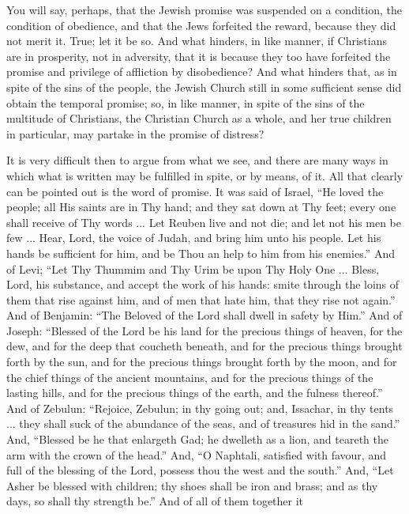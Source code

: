 You will say, perhaps, that the Jewish promise was suspended on a
condition, the condition of obedience, and that the Jews forfeited the
reward, because they did not merit it. True; let it be so. And what
hinders, in like manner, if Christians are in prosperity, not in
adversity, that it is because they too have forfeited the promise and
privilege of affliction by disobedience? And what hinders that, as in
spite of the sins of the people, the Jewish Church still in some
sufficient sense did obtain the temporal promise; so, in like manner,
in spite of the sins of the multitude of Christians, the Christian
Church as a whole, and her true children in particular, may partake in
the promise of distress?

It is very difficult then to argue from what we see, and there are
many ways in which what is written may be fulfilled in spite, or by
means, of it. All that clearly can be pointed out is the word of
promise. It was said of Israel, ``He loved the people; all His
saints are in Thy hand; and they sat down at Thy feet; every one shall
receive of Thy words ... Let Reuben live and not die; and let not his
men be few ... Hear, Lord, the voice of Judah, and bring him unto his
people. Let his hands be sufficient for him, and be Thou an help to
him from his enemies.'' And of Levi; ``Let Thy Thummim and Thy
Urim be upon Thy Holy One ... Bless, Lord, his substance, and accept
the work of his hands: smite through the loins of them that rise
against him, and of men that hate him, that they rise not again.''
And of Benjamin: ``The Beloved of the Lord shall dwell in safety
by Him.'' And of Joseph: ``Blessed of the Lord be his land for
the precious things of heaven, for the dew, and for the deep that
coucheth beneath, and for the precious things brought forth by the
sun, and for the precious things brought forth by the moon, and for
the chief things of the ancient mountains, and for the precious things
of the lasting hills, and for the precious things of the earth, and
the fulness thereof.'' And of Zebulun: ``Rejoice, Zebulun; in
thy going out; and, Issachar, in thy tents ... they shall suck of the
abundance of the seas, and of treasures hid in the sand.'' And,
``Blessed be he that enlargeth Gad; he dwelleth as a lion, and
teareth the arm with the crown of the head.'' And, ``O
Naphtali, satisfied with favour, and full of the blessing of the Lord,
possess thou the west and the south.'' And, ``Let Asher be
blessed with children; thy shoes shall be iron and brass; and as thy
days, so shall thy strength be.'' And of all of them together it
